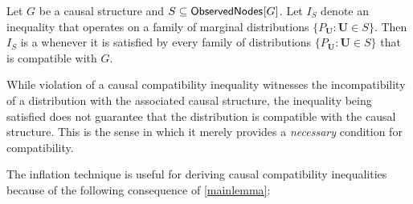 \begin{definition}
Let $G$ be a causal structure and $S \subseteq {\operatorname{\mathsf{ObservedNodes}}_{}}\lbrack G\rbrack$.  Let $I_S$ denote an inequality that operates on a family of marginal distributions  $\{ P_{\bm{U}}: \bm{U} \in S\}$.  Then $I_S$ is a  whenever it is satisfied by every family of distributions $\{ P_{\bm{U}}: \bm{U} \in S\}$ that is compatible with $G$.
\end{definition}
While violation of a causal compatibility inequality witnesses the incompatibility of a distribution with the associated causal structure, the inequality being satisfied does not guarantee that the distribution is compatible with the causal structure.  This is the sense in which it merely provides a {\em necessary} condition for compatibility. 

The inflation technique is useful for deriving causal compatibility inequalities because of the following consequence of  \cref{mainlemma}:

